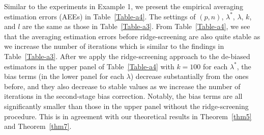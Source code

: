 {{Similar to the experiments in Example 1, we present the empirical averaging estimation errors (AEEs) in Table~\ref{Table-a4}. The settings of $(p,n)$, $\lambda^*$, $\lambda$, $k$, and $l$
are the same as those in Table~\ref{Table-a3}. From Table~\ref{Table-a4}, we see that the averaging estimation errors before ridge-screening are also quite stable as we increase the number of iterations which is similar to the findings in Table~\ref{Table-a3}. After we apply the ridge-screening approach to the de-biased estimators in the upper panel of Table~\ref{Table-a4} with $k=100$ for each $\lambda^*$, the bias terms (in the lower panel for each $\lambda$) decrease substantially from the ones before, and they also decrease to stable values as we increase the number of iterations in the second-stage bias correction. Notably, the bias terms are all significantly smaller than those in the upper panel without the ridge-screening procedure. This is in agreement with our theoretical results in Theorem~\ref{thm5} and Theorem~\ref{thm7}.

}}
